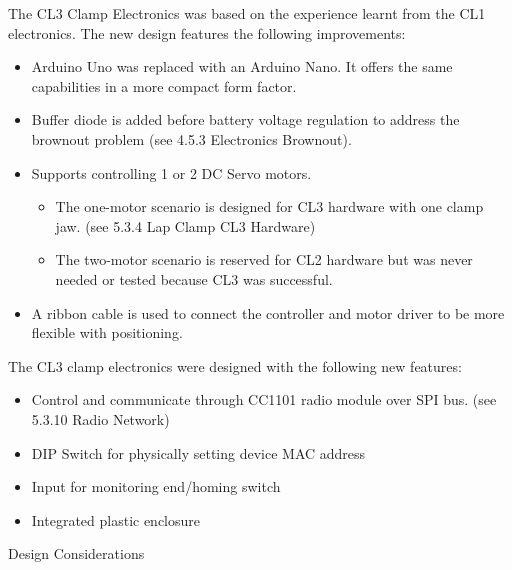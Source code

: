 The CL3 Clamp Electronics was based on the experience learnt from the CL1 electronics. The new design features the following improvements:
\begin{itemize}
    \item Arduino Uno was replaced with an Arduino Nano. It offers the same capabilities in a more compact form factor.
    \item Buffer diode is added before battery voltage regulation to address the brownout problem (see 4.5.3 Electronics Brownout).
    \item Supports controlling 1 or 2 DC Servo motors. 
    \begin{itemize}
        \item The one-motor scenario is designed for CL3 hardware with one clamp jaw. (see 5.3.4 Lap Clamp CL3 Hardware)
        \item The two-motor scenario is reserved for CL2 hardware but was never needed or tested because CL3 was successful.
    \end{itemize}
    \item A ribbon cable is used to connect the controller and motor driver to be more flexible with positioning.
\end{itemize}

The CL3 clamp electronics were designed with the following new features:
\begin{itemize}
    \item Control and communicate through CC1101 radio module over SPI bus. (see 5.3.10 Radio Network)
    \item DIP Switch for physically setting device MAC address
    \item Input for monitoring end/homing switch
    \item Integrated plastic enclosure
\end{itemize}

Design Considerations

